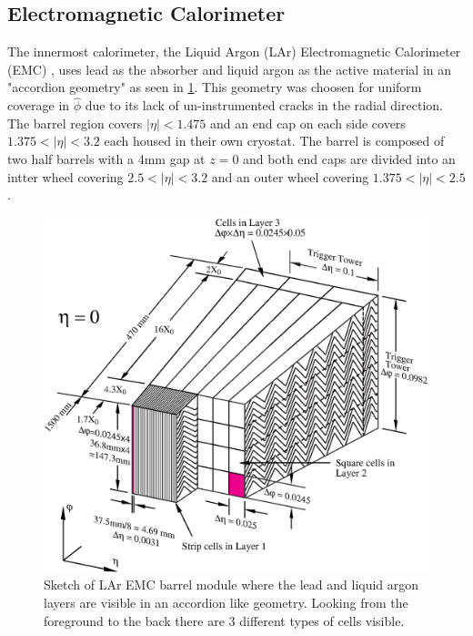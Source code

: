 \subsection{Electromagnetic Calorimeter}

The innermost calorimeter, the Liquid Argon (LAr) Electromagnetic Calorimeter
(EMC) \cite{PERF-2007-01}, uses lead as the absorber and liquid argon as
the active material in an "accordion geometry" as seen in
\cref{fig:accordion}. This geometry was choosen for uniform coverage in
$\hat{\phi}$ due to its lack of un-instrumented cracks in the radial direction.
The barrel region covers $|\eta| < 1.475$ and an end cap on each side covers
$1.375 < |\eta| < 3.2$ each housed in their own cryostat.  The barrel is
composed of two half barrels with a 4mm gap at $z = 0$ and both end caps are
divided into an intter wheel covering $2.5 < |\eta| < 3.2$ and an outer wheel
covering $1.375 < |\eta| < 2.5$.

\begin{figure}[!htbp]
  \begin{center}
    \includegraphics[width=0.8\linewidth]{figures/atlas/accordion}
    \caption{ \cite{PERF-2007-01} Sketch of LAr EMC barrel module where the lead
and liquid argon layers are visible in an accordion like geometry. Looking from
the foreground to the back there are 3 different types of cells visible.}
    \label{fig:accordion}
  \end{center}
\end{figure}

